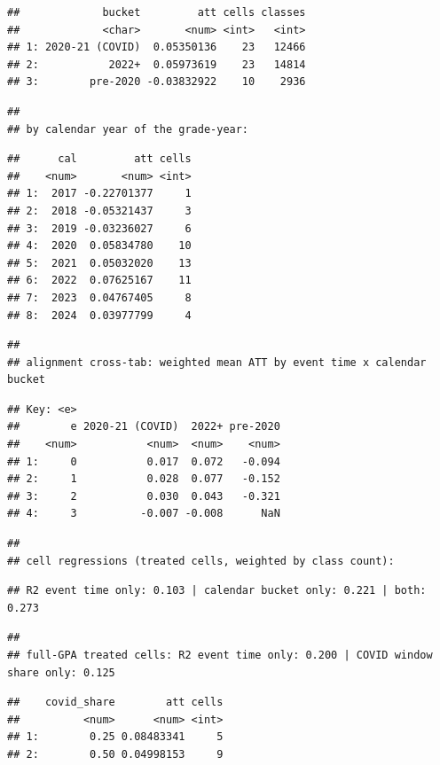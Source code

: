 \documentclass[
]{article}
\begin{document}
\begin{verbatim}
##             bucket         att cells classes
##             <char>       <num> <int>   <int>
## 1: 2020-21 (COVID)  0.05350136    23   12466
## 2:           2022+  0.05973619    23   14814
## 3:        pre-2020 -0.03832922    10    2936
\end{verbatim}

\begin{verbatim}
## 
## by calendar year of the grade-year:
\end{verbatim}

\begin{verbatim}
##      cal         att cells
##    <num>       <num> <int>
## 1:  2017 -0.22701377     1
## 2:  2018 -0.05321437     3
## 3:  2019 -0.03236027     6
## 4:  2020  0.05834780    10
## 5:  2021  0.05032020    13
## 6:  2022  0.07625167    11
## 7:  2023  0.04767405     8
## 8:  2024  0.03977799     4
\end{verbatim}

\begin{verbatim}
## 
## alignment cross-tab: weighted mean ATT by event time x calendar bucket
\end{verbatim}

\begin{verbatim}
## Key: <e>
##        e 2020-21 (COVID)  2022+ pre-2020
##    <num>           <num>  <num>    <num>
## 1:     0           0.017  0.072   -0.094
## 2:     1           0.028  0.077   -0.152
## 3:     2           0.030  0.043   -0.321
## 4:     3          -0.007 -0.008      NaN
\end{verbatim}

\begin{verbatim}
## 
## cell regressions (treated cells, weighted by class count):
\end{verbatim}

\begin{verbatim}
## R2 event time only: 0.103 | calendar bucket only: 0.221 | both: 0.273
\end{verbatim}

\begin{verbatim}
## 
## full-GPA treated cells: R2 event time only: 0.200 | COVID window share only: 0.125
\end{verbatim}

\begin{verbatim}
##    covid_share        att cells
##          <num>      <num> <int>
## 1:        0.25 0.08483341     5
## 2:        0.50 0.04998153     9
\end{verbatim}
\end{document}
